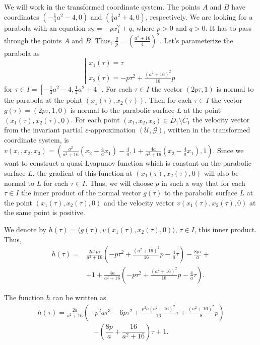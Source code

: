 \documentclass[a4paper]{article}
\begin{document}
We will work in the transformed coordinate system. The points $A$ and $B$ have coordinates $\left(-\frac{1}{4}a^2-4,0\right)$ and $\left(\frac{1}{4}a^2+4,0\right)$, respectively. We are looking for a parabola with an equation $x_2 = -px_1^2 + q$, where $p>0$ and $q>0$. It has to pass through the points $A$ and $B$. Thus, $\frac{q}{p} = \left(\frac{a^2+16}{4}\right)^2$. Let's parameterize the parabola as
$$\left| \begin{array}{l}
x_1(\tau) = \tau\\
x_2(\tau) = -p \tau^2 + \frac{(a^2+16)^2}{16}p
\end{array} \right.$$
for $\tau \in I = \left[-\frac{1}{4}a^2-4,\frac{1}{4}a^2+4\right]$.
For each $\tau \in I$ the vector $(2p\tau,1)$ is normal to the parabola at the point $(x_1(\tau),x_2(\tau))$. Then for each $\tau \in I$ the vector $g(\tau)=(2p\tau,1,0)$ is normal to the parabolic surface $L$ at the point $(x_1(\tau),x_2(\tau),0)$. For each point $(x_1,x_2,x_3) \in \widetilde{D_1} \setminus \widetilde{C_1}$ the velocity vector from the invariant partial $\varepsilon$-approximation $(\mathcal{U},\mathcal{G})$, written in the transformed coordinate system, is $v(x_1,x_2,x_3)=\left(\frac{a^2}{a^2+16}\left(x_2-\frac{4}{a}x_1\right)-\frac{4}{a},1+\frac{4a}{a^2+16}\left(x_2-\frac{4}{a}x_1\right),1\right)$. Since we want to construct a quasi-Lyapunov function which is constant on the parabolic surface $L$, the gradient of this function at $(x_1(\tau),x_2(\tau),0)$ will also be normal to $L$ for each $\tau \in I$. Thus, we will choose $p$ in such a way that for each $\tau \in I$ the inner product of the normal vector $g(\tau)$ to the parabolic surface $L$ at the point $(x_1(\tau),x_2(\tau),0)$ and the velocity vector $v(x_1(\tau),x_2(\tau),0)$ at the same point is positive.

We denote by $h(\tau)=\langle g(\tau), v(x_1(\tau),x_2(\tau),0) \rangle$, $\tau \in I$, this inner product. Thus,
\begin{align*}
    h(\tau) = &\frac{2a^2p\tau}{a^2+16}\left(-p\tau^2 + \frac{(a^2+16)^2}{16}p-\frac{4}{a}\tau\right)-\frac{8p\tau}{a}+
    \\&+1+\frac{4a}{a^2+16}\left(-p\tau^2+\frac{(a^2+16)^2}{16}p-\frac{4}{a}\tau\right).
\end{align*}

The function $h$ can be written as
\begin{align*}
    h(\tau) = \frac{2a}{a^2+16}\left(-p^2 a \tau^3 - 6 p \tau^2 + \frac{p^2 a (a^2+16)^2}{16}\tau +\frac{(a^2+16)^2}{8} p\right) 
\end{align*}
$$
-\left(\frac{8 p}{a} + \frac{16}{a^2+16}\right)\tau + 1.
$$
\end{document}
